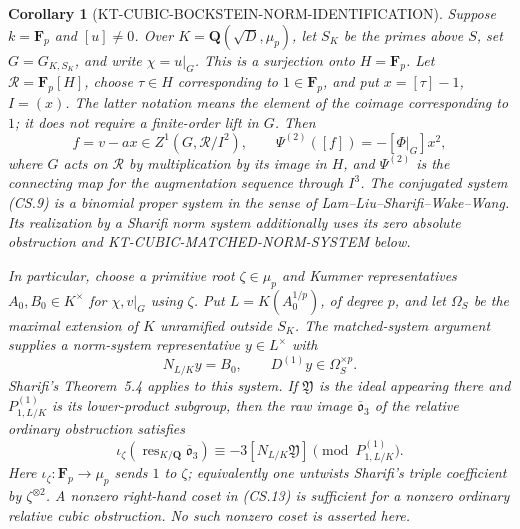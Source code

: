 \documentclass[11pt,a4paper]{article}
\newtheorem{corollary}[theorem]{Corollary}
\theoremstyle{definition}
\begin{document}
\begin{corollary}[KT-CUBIC-BOCKSTEIN-NORM-IDENTIFICATION]
Suppose \(k=\mathbf F_p\) and \([u]\ne0\).
Over \(K=\mathbf Q(\sqrt D,\mu_p)\), let \(S_K\) be
the primes above \(S\), set \(G=G_{K,S_K}\), and write
\(\chi=u|_G\).  This is a surjection onto \(H=\mathbf F_p\).
Let \(\mathcal R=\mathbf F_p[H]\), choose \(\tau\in H\)
corresponding to \(1\in\mathbf F_p\), and put \(x=[\tau]-1\),
\(I=(x)\).  The latter notation means the element of the
coimage corresponding to \(1\); it does not require a
finite-order lift in \(G\).
Then
\[
 f=v-a x\in Z^1(G,\mathcal R/I^2),\qquad
 \Psi^{(2)}([f])=-[\Phi|_G]x^2,                       \tag{CS.11}
\]
where \(G\) acts on \(\mathcal R\) by multiplication
by its image in \(H\), and \(\Psi^{(2)}\) is the
connecting map for the augmentation sequence through
\(I^3\).  The conjugated system (CS.9) is a binomial proper
system in the sense of Lam--Liu--Sharifi--Wake--Wang.
Its realization by a Sharifi norm system additionally
uses its zero absolute obstruction and
KT-CUBIC-MATCHED-NORM-SYSTEM below.

In particular, choose a primitive root \(\zeta\in\mu_p\)
and Kummer representatives \(A_0,B_0\in K^\times\)
for \(\chi,v|_G\) using \(\zeta\).  Put
\(L=K(A_0^{1/p})\), of degree \(p\), and let
\(\Omega_S\) be the maximal extension of \(K\)
unramified outside \(S_K\).  The matched-system
argument supplies a norm-system representative
\(y\in L^\times\) with
\[
 N_{L/K}y=B_0,\qquad D^{(1)}y\in\Omega_S^{\times p}.
                                                               \tag{CS.12}
\]
Sharifi's Theorem~5.4 applies to this system.  If
\(\mathfrak Y\) is the ideal appearing there and
\(P^{(1)}_{1,L/K}\) is its lower-product subgroup,
then the raw image \(\overline{\mathfrak o}_3\) of
the relative ordinary obstruction satisfies
\[
 \iota_\zeta\!\left(\operatorname{res}_{K/\mathbf Q}
                     \overline{\mathfrak o}_3\right)
     \equiv -3[N_{L/K}\mathfrak Y]
             \pmod{P^{(1)}_{1,L/K}}.                  \tag{CS.13}
\]
Here \(\iota_\zeta:\mathbf F_p\to\mu_p\) sends
\(1\) to \(\zeta\); equivalently one untwists
Sharifi's triple coefficient by \(\zeta^{\otimes2}\).
A nonzero right-hand coset in (CS.13) is sufficient
for a nonzero ordinary relative cubic obstruction.
No such nonzero coset is asserted here.
\end{corollary}
\end{document}
